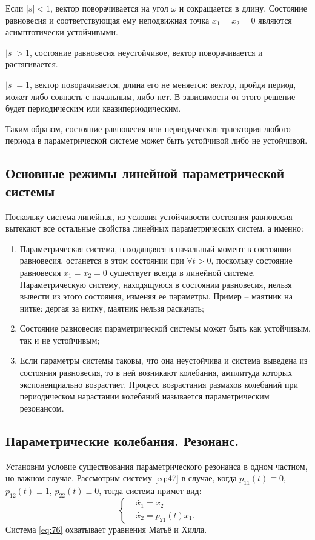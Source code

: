 Если $|s|<1$, вектор поворачивается на угол $\omega$ и сокращается в длину. Состояние равновесия и соответствующая ему неподвижная точка $x_1=x_2=0$ являются асимптотически устойчивыми.

$|s|>1$, состояние равновесия неустойчивое, вектор поворачивается и растягивается.

$|s|=1$, вектор поворачивается, длина его не меняется: вектор, пройдя период, может либо совпасть с начальным, либо нет. В зависимости от этого решение будет периодическим или квазипериодическим.

Таким образом, состояние равновесия или периодическая траектория любого периода в параметрической системе может быть устойчивой либо не устойчивой.

\subsection{Основные режимы линейной параметрической системы}

Поскольку система линейная, из условия устойчивости состояния равновесия вытекают все остальные свойства линейных параметрических систем, а именно:
\begin{enumerate} 
	\item Параметрическая система, находящаяся в начальный момент в состоянии равновесия, останется в этом состоянии при $\forall t>0$, поскольку состояние равновесия $x_1=x_2=0$ существует всегда в линейной системе. Параметрическую систему, находящуюся в состоянии равновесия, нельзя вывести из этого состояния, изменяя ее параметры. Пример -- маятник на нитке: дергая за нитку, маятник нельзя раскачать;
	\item Состояние равновесия параметрической системы может быть как устойчивым, так и не устойчивым;
	\item Если параметры системы таковы, что она неустойчива и система выведена из состояния равновесия, то в ней возникают колебания, амплитуда которых экспоненциально возрастает.  Процесс возрастания размахов колебаний при периодическом нарастании колебаний называется параметрическим резонансом.
\end{enumerate} 

\subsection{Параметрические колебания. Резонанс.}
Установим условие существования параметрического резонанса в одном частном, но важном случае. Рассмотрим систему \eqref{eq:47} в случае, когда $p_{11}(t) \equiv0$, $p_{12}(t)\equiv 1$, $p_{22}(t) \equiv 0$, тогда система примет вид:
\begin{equation}
	\left\{\begin{aligned}
		&\dot{x_1}=x_2 \\
		&\dot{x_2}=p_{21}(t)x_1.
	\end{aligned}\right.
	\label{eq:76}
\end{equation}
Система \eqref{eq:76} охватывает уравнения Матьё и Хилла. 

